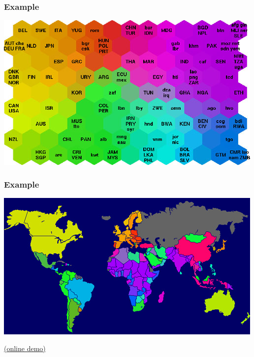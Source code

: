 \documentclass{beamer}
\begin{document}

\begin{frame}
  \frametitle{Example}

  \centering
  \href{http://www.ai-junkie.com/ann/som/som5.html}{\includegraphics[width=\linewidth]{povertymap}}

\end{frame}


\begin{frame}
  \frametitle{Example}

  \centering
  \includegraphics[width=\linewidth]{worldpovertymap}

  \raggedleft
  \tiny
  \href{https://irath96.github.io/som-demo/}{(online demo)}
\end{frame}


\end{document}
